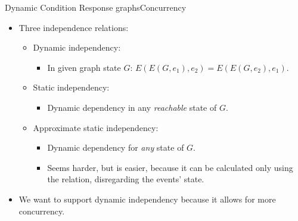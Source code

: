 \documentclass{beamer}
\begin{document}
\begin{frame}{Dynamic Condition Response graphs}{Concurrency}
	\begin{itemize}
  	\item Three independence relations:
  	\begin{itemize}
  		\item Dynamic independency:
  		\begin{itemize}
  			\item In given graph state $G$: $E(E(G, e_1),e_2)=E(E(G, e_2),e_1)$.
  		\end{itemize}

			\vfill

  		\item Static independency:
  		\begin{itemize}
  			\item Dynamic dependency in any \textit{reachable} state of $G$.
  		\end{itemize}

			\vfill

			\item Approximate static independency:
			\begin{itemize}
			 	\item Dynamic dependency for \textit{any} state of $G$.
			 	\item Seems harder, but is easier, because it can be calculated only using the relation, disregarding the events' state.
			\end{itemize} 
  	\end{itemize}

			\vfill

		\item We want to support dynamic independency because it allows for more concurrency.
  \end{itemize}
\end{frame}
\end{document}
